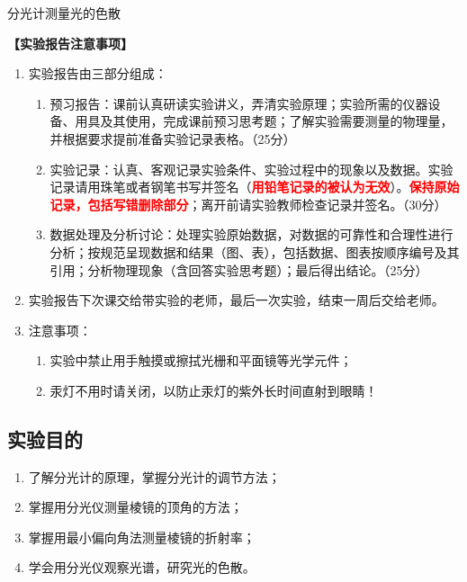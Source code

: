 \documentclass[dvipsnames, svgnames,a4paper,11pt]{article}
\begin{document}

\infoTable{}{}{}{}{}{} %

\begin{center}
	\LARGE 分光计测量光的色散
\end{center}

\textbf{【实验报告注意事项】}
\begin{enumerate}
	\item 实验报告由三部分组成：
	\begin{enumerate}
		\item 预习报告：课前认真研读实验讲义，弄清实验原理；实验所需的仪器设备、用具及其使用，完成课前预习思考题；了解实验需要测量的物理量，并根据要求提前准备实验记录表格。（25分）
	    \item 实验记录：认真、客观记录实验条件、实验过程中的现象以及数据。实验记录请用珠笔或者钢笔书写并签名（\textcolor{red}{\textbf{用铅笔记录的被认为无效}}）。\textcolor{red}{\textbf{保持原始记录，包括写错删除部分}}；离开前请实验教师检查记录并签名。（30分）
	    \item 数据处理及分析讨论：处理实验原始数据，对数据的可靠性和合理性进行分析；按规范呈现数据和结果（图、表），包括数据、图表按顺序编号及其引用；分析物理现象（含回答实验思考题）；最后得出结论。（25分）
	\end{enumerate}
	\item 实验报告下次课交给带实验的老师，最后一次实验，结束一周后交给老师。
	\item 注意事项：
	\begin{enumerate}
		\item 实验中禁止用手触摸或擦拭光栅和平面镜等光学元件；
		\item 汞灯不用时请关闭，以防止汞灯的紫外长时间直射到眼睛！
	\end{enumerate}
\end{enumerate}

\clearpage

\setcounter{section}{0}
	
\subsection{实验目的}
\begin{enumerate}
	\item 了解分光计的原理，掌握分光计的调节方法；
	\item 掌握用分光仪测量棱镜的顶角的方法；
	\item 掌握用最小偏向角法测量棱镜的折射率；
	\item 学会用分光仪观察光谱，研究光的色散。
\end{enumerate}
\end{document}
